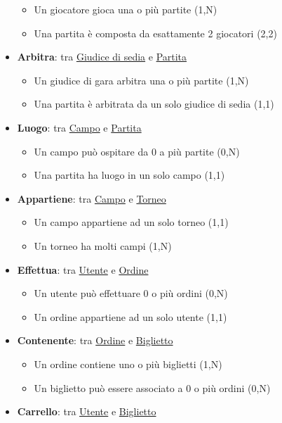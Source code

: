 \documentclass[10pt]{article}
\begin{document}
\begin{itemize}
    \begin{itemize}
        \item Un giocatore gioca una o più partite (1,N)
        \item Una partita è composta da esattamente 2 giocatori (2,2)
    \end{itemize}
    \item \textbf{Arbitra}: tra \underline{Giudice di sedia} e \underline{Partita}
    \begin{itemize}
        \item Un giudice di gara arbitra una o più partite (1,N)
        \item Una partita è arbitrata da un solo giudice di sedia (1,1)
    \end{itemize}
    \item \textbf{Luogo}: tra \underline{Campo} e \underline{Partita}
    \begin{itemize}
        \item Un campo può ospitare da 0 a più partite (0,N)
        \item Una partita ha luogo in un solo campo (1,1)
    \end{itemize}
    \item \textbf{Appartiene}: tra \underline{Campo} e \underline{Torneo}
    \begin{itemize}
        \item Un campo appartiene ad un solo torneo (1,1)
        \item Un torneo ha molti campi (1,N)
    \end{itemize}
    \item \textbf{Effettua}: tra \underline{Utente} e \underline{Ordine}
    \begin{itemize}
        \item Un utente può effettuare 0 o più ordini (0,N)
        \item Un ordine appartiene ad un solo utente (1,1)
    \end{itemize}
    \item \textbf{Contenente}: tra \underline{Ordine} e \underline{Biglietto}
    \begin{itemize}
        \item Un ordine contiene uno o più biglietti (1,N)
        \item Un biglietto può essere associato a 0 o più ordini (0,N)
    \end{itemize}
    \item \textbf{Carrello}: tra \underline{Utente} e \underline{Biglietto}

\end{itemize}
\end{document}

